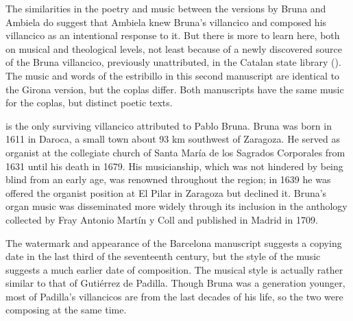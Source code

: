 The similarities in the poetry and music between the versions by Bruna and
Ambiela do suggest that Ambiela knew Bruna's villancico and composed his
villancico as an intentional response to it.
But there is more to learn here, both on musical and theological levels, not
least because of a newly discovered source of the Bruna villancico, previously
unattributed, in the Catalan state library ().
The music and words of the estribillo in this second manuscript are identical to
the Girona version, but the coplas differ.  
Both manuscripts have the same music for the coplas, but distinct poetic texts.

 is the only surviving villancico attributed to Pablo Bruna.
Bruna was born in 1611 in Daroca, a small town about 93 km southwest of Zaragoza.
He served as organist at the collegiate church of Santa María de los Sagrados
Corporales from 1631 until his death in 1679.%
	\Autocite[104]{Calahorra:Aragon}
His musicianship, which was not hindered by being blind from an early age, was
renowned throughout the region; in 1639 he was offered the organist position at
El Pilar in Zaragoza but declined it.%
    \Autocite[123--125]{Calahorra:Aragon}
Bruna's organ music was disseminated more widely through its inclusion in the
anthology  collected by Fray
Antonio Martín y Coll and published in Madrid in 1709.

The watermark and appearance of the Barcelona manuscript suggests a copying date
in the last third of the seventeenth century, but the style of the music
suggests a much earlier date of composition.  
The musical style is actually rather similar to that of Gutiérrez de Padilla. 
Though Bruna was a generation younger, most of Padilla's villancicos are from
the last decades of his life, so the two were composing at the same time.

\endinput
\subsection{Devotional Function: Eucharistic Adoration}

Bruna's villancico would function well for Eucharistic devotion, in both its poetic content and musical style.
The piece seems to fit in a subtype of chamber villancico dedicated \foreign{al Santísimo Sacramento} (to the Blessed Sacrament) and intended not for the extravert public festivities of Corpus Christi, but for more reflective and intimate occasions of Eucharistic adoration.
Bruna's madrigalesque counterpoint for four voices is similar to other such pieces from before 1660, in contrast to the solo and duo continuo-songs that predominate later.%
	\footnote{%
The Girona manuscript does include an accompaniment part labeled \quoted{entablatura}, but this is primarily a \term{basso seguente} rather than the independent continuo part found in Irízar and Carrión.
	}

